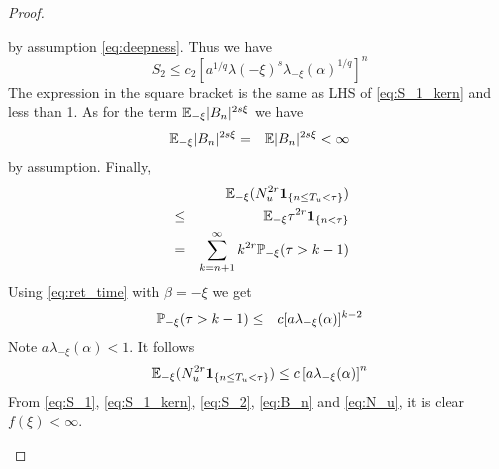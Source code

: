 \documentclass{article}
\theoremstyle{remark}
\begin{document}
\begin{proof}
\begin{enumerate}
\[    \]
    by assumption \eqref{eq:deepness}. Thus we have
    \begin{equation}
      \label{eq:S_2}
      S_2 \leq c_2 \left[
        a^{1/q} \lambda(-\xi)^s
        \lambda_{-\xi}(\alpha)^{1/q}
      \right]^n
    \end{equation}
    The expression in the square bracket is the same as LHS of
    \eqref{eq:S_1_kern} and less than 1. As for the term
    $\E_{-\xi}|B_n|^{2s\xi}$ we have
    \begin{eqnarray}
      \E_{-\xi}|B_n|^{2s\xi} &=& \E|B_n|^{2s\xi} < \infty
      \label{eq:B_n}
    \end{eqnarray}
    by assumption. Finally,
    \begin{eqnarray*}
      && \E_{-\xi}(N_u^{2r}\1{n \leq T_u < \tau}) \\
      &\leq& \E_{-\xi} \tau^{2r} \1{n < \tau} \\
      &=& \sum_{k=n+1}^\infty k^{2r}
      \P_{-\xi}(\tau > k-1) \\
    \end{eqnarray*}
    Using \eqref{eq:ret_time} with $\beta = -\xi$ we get
    \begin{eqnarray*}
      \P_{-\xi}(\tau > k-1) &\leq&
      c [a \lambda_{-\xi}(\alpha)]^{k-2}
    \end{eqnarray*}
    Note $a \lambda_{-\xi}(\alpha) < 1$. It follows
    \begin{equation}
      \label{eq:N_u}
      \E_{-\xi}(N_u^{2r}\1{n \leq T_u < \tau}) \leq
      c \left[
        a \lambda_{-\xi}(\alpha)
      \right]^{n}
    \end{equation}
    From \eqref{eq:S_1}, \eqref{eq:S_1_kern}, \eqref{eq:S_2},
    \eqref{eq:B_n} and \eqref{eq:N_u}, it is clear $f(\xi) < \infty$.


\end{enumerate}
\end{proof}
\end{document}
